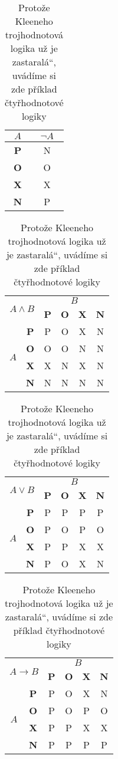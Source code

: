 \documentclass[a4paper,11pt]{article}
\newcommand{\myuv}[1]{\quotedblbase #1\textquotedblleft}
\begin{document}
\begin{table}[h]
\centering
\begin{tabular}{|c|c|}
\hline
$A$          & $\neg A$ \\ \hline
\textbf{P} & N \\ \hline
\textbf{O} & O \\ \hline
\textbf{X} & X \\ \hline
\textbf{N} & P \\ \hline
\end{tabular}
\begin{tabular}{|c|c|c|c|c|c|}
\hline
\multicolumn{2}{|c|}{\multirow{2}{*}{\textit{$A \wedge B$}}} & \multicolumn{4}{c|}{$B$} \\ \cline{3-6} 
\multicolumn{2}{|c|}{} & \textbf{P} & \textbf{O} & \textbf{X} & \textbf{N} \\ \hline
\multirow{4}{*}{$A$} & \textbf{P} & P & O & X  & N \\ \cline{2-6} 
& \textbf{O} & O & O & N & N \\ \cline{2-6} 
& \textbf{X} & X & N & X & N \\ \cline{2-6} 
& \textbf{N} & N & N & N & N \\ \hline
\end{tabular}
\begin{tabular}{|c|c|c|c|c|c|}
\hline
\multicolumn{2}{|c|}{\multirow{2}{*}{\textit{$A \vee B$}}} & \multicolumn{4}{c|}{$B$} \\ \cline{3-6} 
\multicolumn{2}{|c|}{} & \textbf{P} & \textbf{O} & \textbf{X} & \textbf{N} \\ \hline
\multirow{4}{*}{$A$} & \textbf{P} & P & P & P & P \\ \cline{2-6} 
& \textbf{O} & P & O & P & O \\ \cline{2-6} 
& \textbf{X} & P & P & X & X \\ \cline{2-6} 
& \textbf{N} & P & O & X & N \\ \hline
\end{tabular}
\begin{tabular}{|c|c|c|c|c|c|}
\hline
\multicolumn{2}{|c|}{\multirow{2}{*}{\textit{$A \rightarrow B$}}} & \multicolumn{4}{c|}{$B$} \\ \cline{3-6} 
\multicolumn{2}{|c|}{} & \textbf{P} & \textbf{O} & \textbf{X} & \textbf{N} \\ \hline
\multirow{4}{*}{$A$} & \textbf{P} & P & O & X & N \\ \cline{2-6} 
& \textbf{O} & P & O & P & O \\ \cline{2-6} 
& \textbf{X} & P & P & X & X \\ \cline{2-6} 
& \textbf{N} & P & P & P & P \\ \hline
\end{tabular}
\caption{Protože Kleeneho trojhodnotová logika už je \myuv{zastaralá}, uvádíme si zde příklad čtyřhodnotové logiky}
\label{tabulka2}
\end{table}
\pagebreak
\end{document}
